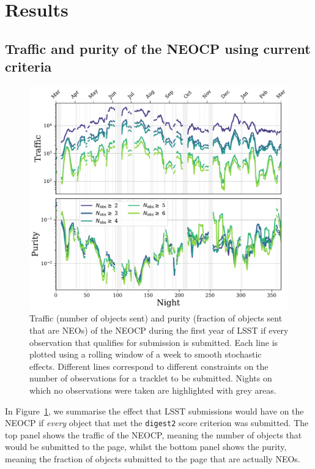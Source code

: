\documentclass[twocolumn]{aastex631}
\newcommand{\dig}{\texttt{digest2}}
\begin{document}
\section{Results} \label{sec:results}
\subsection{Traffic and purity of the NEOCP using current criteria}\label{sec:traffic_basic}
\begin{figure}
    \centering
    \includegraphics[width=\textwidth]{traffic_purity.pdf}
    \caption{Traffic (number of objects sent) and purity (fraction of objects sent that are NEOs) of the NEOCP during the first year of LSST if every observation that qualifies for submission is submitted. Each line is plotted using a rolling window of a week to smooth stochastic effects. Different lines correspond to different constraints on the number of observations for a tracklet to be submitted. Nights on which no observations were taken are highlighted with grey areas.}
    \label{fig:neocp_traffic}
\end{figure}

In Figure~\ref{fig:neocp_traffic}, we summarise the effect that LSST submissions would have on the NEOCP if \textit{every} object that met the \dig{} score criterion was submitted. The top panel shows the traffic of the NEOCP, meaning the number of objects that would be submitted to the page, whilst the bottom panel shows the purity, meaning the fraction of objects submitted to the page that are actually NEOs.
\end{document}
